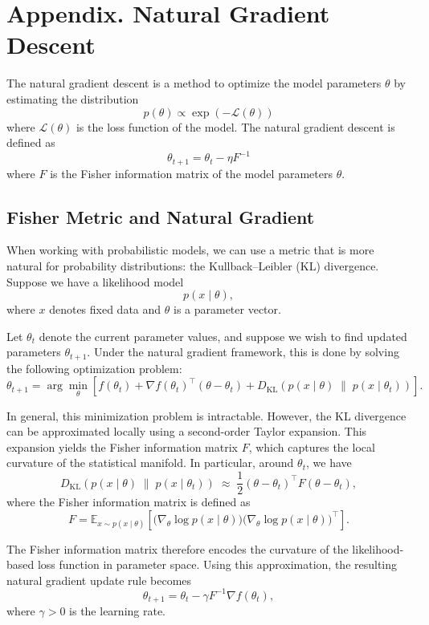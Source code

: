 \documentclass[12pt]{article}
\newcommand{\eL}{\mathcal{L}}
\begin{document}
\section{Appendix. Natural Gradient Descent}
The natural gradient descent is a method to optimize the model parameters $\theta$ by estimating the distribution
\[
    p(\theta) \propto \exp(-\eL(\theta))
\]
where $\eL(\theta)$ is the loss function of the model.
The natural gradient descent is defined as
\[
    \theta_{t+1} = \theta_t - \eta F^{-1}
\]
where $F$ is the Fisher information matrix of the model parameters $\theta$.

\subsection*{Fisher Metric and Natural Gradient}

When working with probabilistic models, we can use a metric that is more natural for probability distributions: the Kullback--Leibler (KL) divergence. Suppose we have a likelihood model
\[
p(x \mid \theta),
\]
where \(x\) denotes fixed data and \(\theta\) is a parameter vector.

Let \(\theta_t\) denote the current parameter values, and suppose we wish to find updated parameters \(\theta_{t+1}\). Under the natural gradient framework, this is done by solving the following optimization problem:
\[
\theta_{t+1}
=
\arg\min_{\theta}
\left[
f(\theta_t)
+
\nabla f(\theta_t)^\top (\theta - \theta_t)
+
D_{\mathrm{KL}}\!\left(
p(x \mid \theta)
\;\|\;
p(x \mid \theta_t)
\right)
\right].
\]

In general, this minimization problem is intractable. However, the KL divergence can be approximated locally using a second-order Taylor expansion. This expansion yields the Fisher information matrix \(F\), which captures the local curvature of the statistical manifold. In particular, around \(\theta_t\), we have
\[
D_{\mathrm{KL}}\!\left(
p(x \mid \theta)
\;\|\;
p(x \mid \theta_t)
\right)
\;\approx\;
\frac{1}{2}
(\theta - \theta_t)^\top
F
(\theta - \theta_t),
\]
where the Fisher information matrix is defined as
\[
F
=
\mathbb{E}_{x \sim p(x \mid \theta)}
\left[
\bigl( \nabla_\theta \log p(x \mid \theta) \bigr)
\bigl( \nabla_\theta \log p(x \mid \theta) \bigr)^\top
\right].
\]

The Fisher information matrix therefore encodes the curvature of the likelihood-based loss function in parameter space. Using this approximation, the resulting natural gradient update rule becomes
\[
\theta_{t+1}
=
\theta_t
-
\gamma
F^{-1}
\nabla f(\theta_t),
\]
where \(\gamma > 0\) is the learning rate.
\end{document}
